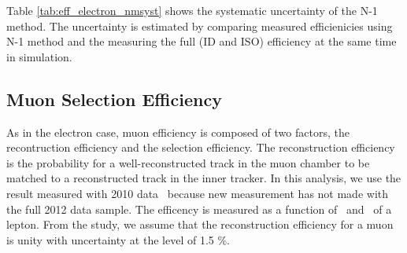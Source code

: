 Table \ref{tab:eff_electron_nmsyst} shows the systematic uncertainty of the N-1 method. 
The uncertainty is estimated by comparing measured efficienicies using N-1 method and 
the measuring the full (ID and ISO) efficiency at the same time in simulation. 

\subsection{Muon Selection Efficiency}

As in the electron case, muon efficiency is composed of two factors, 
the recontruction efficiency and the selection efficiency. 
The reconstruction efficiency is the probability for a 
well-reconstructed track in the muon chamber to be matched to a reconstructed track 
in the inner tracker. In this analysis, we use the result measured with 2010 
data~\cite{Khachatryan:2010xn}   
because new measurement has not made with the full 2012 data sample. 
The efficency is measured as a function 
of \pt~and \Eta~of a lepton. From the study, we assume that the reconstruction 
efficiency for a muon is unity with uncertainty at the level of 1.5 \%.


